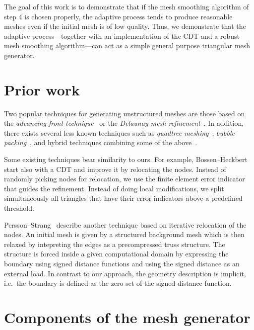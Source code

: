 \documentclass[11pt]{article}
\begin{document}
The goal of this work is to demonstrate that if the mesh smoothing algorithm of
step 4 is chosen properly, the adaptive process tends to produce reasonable
meshes even if the initial mesh is of low quality.  Thus, we demonstrate that
the adaptive process---together with an implementation of the CDT and a robust
mesh smoothing algorithm---can act as a simple general purpose triangular mesh
generator.

\section{Prior work}
\label{sec:org7798f6d}

Two popular techniques for generating unstructured meshes are those based on the
\emph{advancing front technique}~\cite{L_hner_1988} or the \emph{Delaunay mesh
refinement}~\cite{Chew_1989, Ruppert_1995, Shewchuk_2002}.  In addition, there
exists several less known techniques such as \emph{quadtree
meshing}~\cite{Yerry_1983}, \emph{bubble packing}~\cite{Shimada_1995}, and
hybrid techniques combining some of the above~\cite{mavriplis1995advancing}.

Some existing techniques bear similarity to ours.  For example,
Bossen--Heckbert~\cite{bossen1996pliant} start also with a CDT and improve it by
relocating the nodes.  Instead of randomly picking nodes for relocation, we use
the finite element error indicator that guides the refinement.  Instead of doing
local modifications, we split simultaneously all triangles that have their error indicators
above a predefined threshold.

Persson--Strang~\cite{persson2004simple} describe another technique based on
iterative relocation of the nodes.  An initial mesh is given by a structured
background mesh which is then relaxed by intepreting the edges as a
precompressed truss structure.  The structure is forced inside a given
computational domain by expressing the boundary using signed distance functions
and using the signed distance as an external load.  In contrast to our approach,
the geometry description is implicit, i.e.~the boundary is defined as the zero
set of the signed distance function.




\section{Components of the mesh generator}
\label{sec:components}
\end{document}
